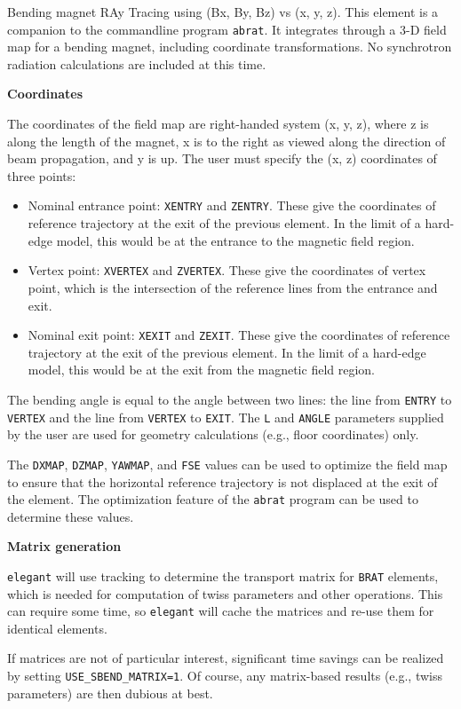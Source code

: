 Bending magnet RAy Tracing using (Bx, By, Bz) vs (x, y, z).
This element is a companion to the commandline program {\tt abrat}.
It integrates through a 3-D field map for a bending magnet, including
coordinate transformations.
No synchrotron radiation calculations are included at this time.

{\bf Coordinates}

The coordinates of the field map are right-handed system (x, y, z), where z is along the length of the magnet, x is 
to the right as viewed along the direction of beam propagation, and y is up.
The user must specify the (x, z) coordinates of three points:
\begin{itemize}
\item Nominal entrance point: \verb|XENTRY| and \verb|ZENTRY|. These give the coordinates of reference trajectory at
  the exit of the previous element. In the limit of a hard-edge model, this would be at the entrance to the magnetic field 
  region.
\item Vertex point: \verb|XVERTEX| and \verb|ZVERTEX|. These give the coordinates of vertex point, which is the intersection
  of the reference lines from the entrance and exit.
\item Nominal exit point: \verb|XEXIT| and \verb|ZEXIT|. These give the coordinates of reference trajectory at
  the exit of the previous element. In the limit of a hard-edge model, this would be at the exit from the magnetic field 
  region.
\end{itemize}
The bending angle is equal to the angle between two lines: the line from \verb|ENTRY| to \verb|VERTEX| and the
line from \verb|VERTEX| to \verb|EXIT|.
The \verb|L| and \verb|ANGLE| parameters supplied by the user are used for geometry calculations (e.g., floor coordinates) only.

The \verb|DXMAP|, \verb|DZMAP|, \verb|YAWMAP|, and \verb|FSE| values can be used to optimize the field map to ensure that
the horizontal reference trajectory is not displaced at the exit of the element.
The optimization feature of the \verb|abrat| program can be used to determine these values.

{\bf Matrix generation}

{\tt elegant} will use tracking to determine the transport matrix for \verb|BRAT| elements, which 
is needed for computation of twiss parameters and other operations.
This can require some time, so {\tt elegant} will cache the matrices and re-use them for
identical elements.

If matrices are not of particular interest, significant time savings can be realized by setting
\verb|USE_SBEND_MATRIX=1|. Of course, any matrix-based results (e.g., twiss parameters) are then
dubious at best.

